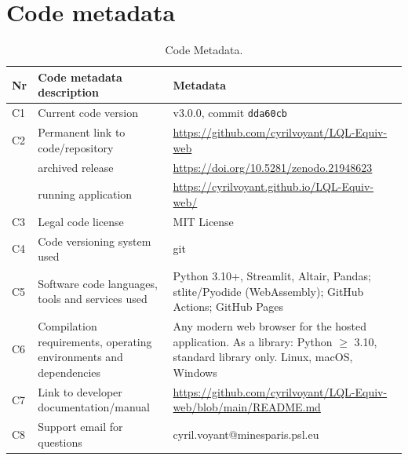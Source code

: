 \documentclass[preprint,12pt,number]{elsarticle}
\begin{document}
\section*{Code metadata}

\begin{table}[h!]
\centering
\small
\begin{tabular}{@{}lp{4.6cm}p{7.0cm}@{}}
\toprule
\textbf{Nr} & \textbf{Code metadata description} & \textbf{Metadata} \\
\midrule
C1 & Current code version & v3.0.0, commit \texttt{dda60cb} \\
C2 & Permanent link to code/repository & \url{https://github.com/cyrilvoyant/LQL-Equiv-web} \\
   & \quad archived release & \url{https://doi.org/10.5281/zenodo.21948623} \\
   & \quad running application & \url{https://cyrilvoyant.github.io/LQL-Equiv-web/} \\
C3 & Legal code license & MIT License \\
C4 & Code versioning system used & git \\
C5 & Software code languages, tools and services used & Python 3.10+, Streamlit, Altair, Pandas; stlite/Pyodide (WebAssembly);
     GitHub Actions; GitHub Pages \\
C6 & Compilation requirements, operating environments and dependencies & Any modern web browser for the hosted application. As a library:
     Python $\geq$ 3.10, standard library only. Linux, macOS, Windows \\
C7 & Link to developer documentation/manual & \url{https://github.com/cyrilvoyant/LQL-Equiv-web/blob/main/README.md} \\
C8 & Support email for questions & cyril.voyant@minesparis.psl.eu \\
\bottomrule
\end{tabular}
\caption{Code Metadata.}
\label{tab:metadata}
\end{table}

\end{document}

